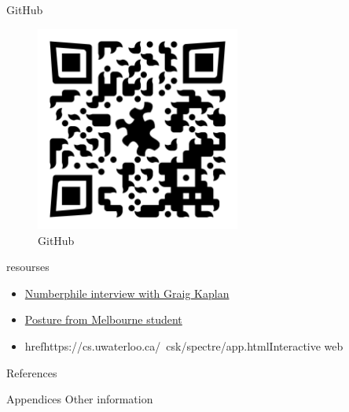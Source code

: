 \documentclass{beamer}
\begin{document}
\begin{frame}{GitHub}
    \begin{figure}
        \centering
        \includegraphics[width=0.6\textwidth]{images/qr-codes/tilling-presentation-github.png}
        \caption{GitHub}
        \label{fig:github-qrcode}
    \end{figure}
\end{frame}

\begin{frame}{resourses}
    \begin{itemize}
        \item \href{https://www.youtube.com/watch?v=_ZS3Oqg1AX0&ab_channel=Numberphile}{Numberphile interview with Graig Kaplan}
        \item \href{https://ms.unimelb.edu.au/__data/assets/pdf_file/0011/5218382/vujamie_296128_22162633_Jamie_Vu_Poster_final.pdf}{Posture from Melbourne student}
        \item href{https://cs.uwaterloo.ca/~csk/spectre/app.html}{Interactive web}
    \end{itemize}
\end{frame}

\begin{frame}{References}
    
\end{frame}



\begin{frame}{Appendices}
    Other information
\end{frame}

% 
\end{document}
